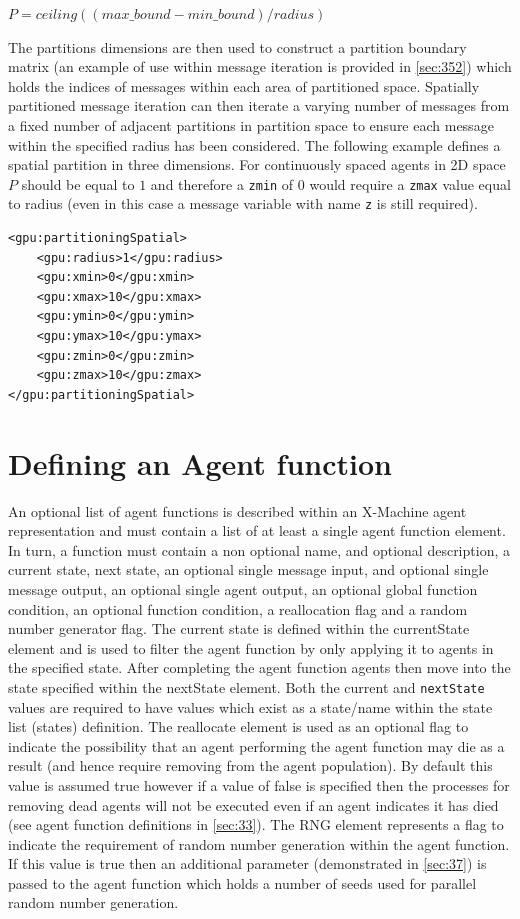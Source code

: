 \documentclass[11pt, a4paper, onecolumn, oneside]{report}
\begin{document}
$P = ceiling((max\_bound - min\_bound) / radius)$

The partitions dimensions are then used to construct a partition boundary matrix (an example of use within message iteration is provided in \cref{sec:352}) which holds the indices of messages within each area of partitioned space.
Spatially partitioned message iteration can then iterate a varying number of messages from a fixed number of adjacent partitions in partition space to ensure each message within the specified radius has been considered.
The following example defines a spatial partition in three dimensions.
For continuously spaced agents in 2D space $P$ should be equal to $1$ and therefore a \texttt{zmin} of $0$ would require a \texttt{zmax} value equal to radius (even in this case a message variable with name \texttt{z} is still required).

\begin{verbatim}
<gpu:partitioningSpatial>
    <gpu:radius>1</gpu:radius>
    <gpu:xmin>0</gpu:xmin>
    <gpu:xmax>10</gpu:xmax>
    <gpu:ymin>0</gpu:ymin>
    <gpu:ymax>10</gpu:ymax>
    <gpu:zmin>0</gpu:zmin>
    <gpu:zmax>10</gpu:zmax>
</gpu:partitioningSpatial>
\end{verbatim}


\section{Defining an Agent function}
\label{sec:25}


An optional list of agent functions is described within an X-Machine agent representation and must contain a list of at least a single agent function element.
In turn, a function must contain a non optional name, and optional description, a current state, next state, an optional single message input, and optional single message output, an optional single agent output, an optional global function condition, an optional function condition, a reallocation flag and a random number generator flag.
The current state is defined within the currentState element and is used to filter the agent function by only applying it to agents in the specified state.
After completing the agent function agents then move into the state specified within the nextState element.
Both the current and \texttt{nextState} values are required to have values which exist as a state/name within the state list (states) definition.
The reallocate element is used as an optional flag to indicate the possibility that an agent performing the agent function may die as a result (and hence require removing from the agent population).
By default this value is assumed true however if a value of false is specified then the processes for removing dead agents will not be executed even if an agent indicates it has died (see agent function definitions in \cref{sec:33}).
The RNG element represents a flag to indicate the requirement of random number generation within the agent function.
If this value is true then an additional parameter (demonstrated in \cref{sec:37}) is passed to the agent function which holds a number of seeds used for parallel random number generation.
\end{document}
